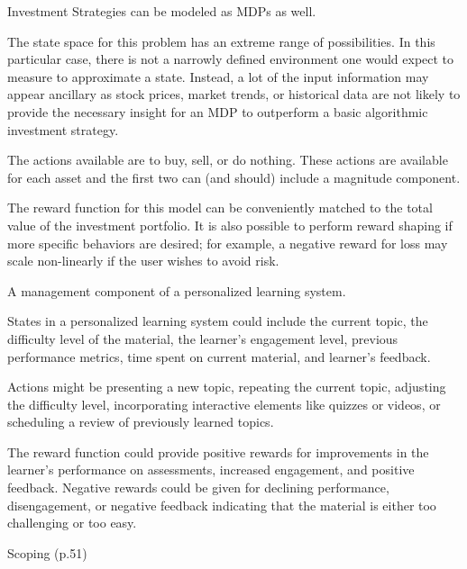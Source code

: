 \documentclass[12pt,letterpaper]{exam}
\begin{document}
\begin{questions}
\begin{solution}
\begin{parts}
			\item Investment Strategies can be modeled as MDPs as well.
			
			The state space for this problem has an extreme range of possibilities.
			In this particular case, there is not a narrowly defined environment one would expect to measure to approximate a state.
			Instead, a lot of the input information may appear ancillary as stock prices, market trends, or historical data are not likely
			to provide the necessary insight for an MDP to outperform a basic algorithmic investment strategy. 
			
			The actions available are to buy, sell, or do nothing. 
			These actions are available for each asset and the first two can (and should) include a magnitude component.
			
			The reward function for this model can be conveniently matched to the total value of the investment portfolio.
			It is also possible to perform reward shaping if more specific behaviors are desired; 
			for example, a negative reward for loss may scale non-linearly if the user wishes to avoid risk.

			\item A management component of a personalized learning system.
			
			States in a personalized learning system could include the current topic, the difficulty level of the material, 
			the learner's engagement level, previous performance metrics, time spent on current material, and learner's feedback.

			Actions might be presenting a new topic, repeating the current topic, adjusting the difficulty level, 
			incorporating interactive elements like quizzes or videos, or scheduling a review of previously learned topics.

			The reward function could provide positive rewards for improvements in the learner's performance on assessments, 
			increased engagement, and positive feedback. 
			Negative rewards could be given for declining performance, disengagement, 
			or negative feedback indicating that the material is either too challenging or too easy.
			
		\end{parts}
	\end{solution}


	\setcounter{question}{3-1}%
	\question%
	Scoping (p.51)


\end{questions}
\end{document}
